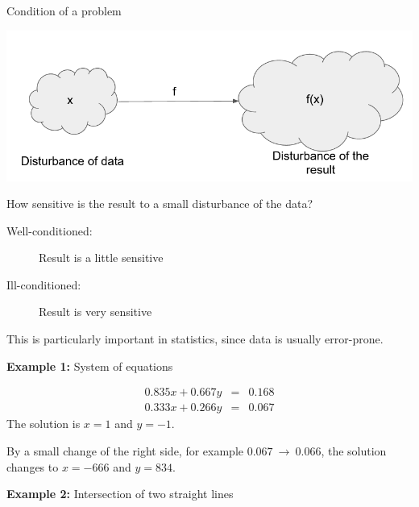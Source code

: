 

\begin{vbframe}{Condition of a problem}

\begin{center}
\includegraphics[width = .6\textwidth]{figure_man/condition_eng.PNG}
\end{center}

How sensitive is the result to a small disturbance of the data?

\begin{description}
 \item[Well-conditioned:] Result is a little sensitive
 \item[Ill-conditioned:] Result is very sensitive
\end{description}

This is particularly important in statistics, since data is usually error-prone.

%
%
%

\framebreak

\textbf{Example 1: }System of equations

\begin{eqnarray*}
0.835x + 0.667y &=& 0.168 \\
0.333x + 0.266y &=& 0.067
\end{eqnarray*}
The solution is $x = 1$ and $y = -1$.

\lz

By a small change of the right side, for example $0.067~\to~0.066$, the solution changes to
$x = -666$ and $y = 834$.

\framebreak

\textbf{Example 2: }Intersection of two straight lines

\begin{center}


\end{center}
\end{vbframe}
